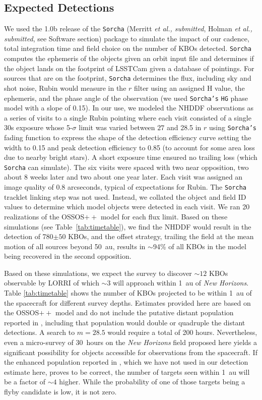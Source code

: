 \documentclass[modern,preprint]{aastex7}
\begin{document}
\subsection{Expected Detections}
We used the 1.0b release of the \texttt{Sorcha} (Merritt {\it et al., submitted}, Holman {\it et al., submitted}, see Software section) package to simulate the impact of our cadence, total integration time and field choice on the number of KBOs detected. 
\texttt{Sorcha} computes the ephemeris of the objects given an orbit input file and determines if the object lands on the footprint of LSSTCam given a database of pointings.  
For sources that are on the footprint, \texttt{Sorcha} determines the flux, including sky and shot noise, Rubin would measure in the $r$ filter using an assigned H value, the ephemeris, and the phase angle of the observation (we used \texttt{Sorcha's} \texttt{HG} phase model with a slope of 0.15). 
In our use, we modeled the NHDDF observations as a series of visits to a single Rubin pointing where each visit consisted of a single 30s exposure whose 5-$\sigma$ limit was varied between $27$ and 28.5 in $r$ using \texttt{Sorcha's} fading function to express the shape of the detection efficiency curve setting the width to 0.15 and peak detection efficiency to 0.85 (to account for some area loss due to nearby bright stars).  
A short exposure time ensured no trailing loss (which \texttt{Sorcha} can simulate).  
The six visits were spaced with two near opposition, two about 8 weeks later and two about one year later. 
Each visit was assigned an image quality of 0.8 arcseconds, typical of expectations for Rubin.
The \texttt{Sorcha} tracklet linking step was not used. Instead, we collated the object and field ID values to determine which model objects were detected in each visit. 
We ran 20 realizations of the OSSOS$++$ model for each flux limit.
Based on these simulations (see Table~\ref{tab:timetable}), we find the NHDDF would result in the detection of 780$\pm{50}$ KBOs, and the offset strategy, trailing the field at the mean motion of all sources beyond 50~au, results in $\sim$94\% of all KBOs in the model being recovered in the second opposition.

Based on these simulations, we expect the survey to discover $\sim12$ KBOs observable by LORRI of which $\sim$3 will approach within 1~au of {\it New Horizons}.
Table \ref{tab:timetable} shows the number of KBOs projected to be within 1~au of the spacecraft for different survey depths. Estimates provided here are based on the OSSOS$++$ model and do not include the putative distant population reported in \citep{Fraser2024PSJ}, including that population would double or quadruple the distant detections. 
A search to $m=28.5$ would require a total of 200 hours. Nevertheless, even a micro-survey of 30~hours on the {\it New Horizons} field proposed here yields a significant possibility for objects accessible for observations from the spacecraft. 
If the enhanced population reported in \citep{Fraser2024PSJ}, which we have not used in our detection estimate here, proves to be correct, the number of targets seen within 1~au will be a factor of $\sim4$ higher. 
While the probability of one of those targets being a flyby candidate is low, it is not zero.
\end{document}
